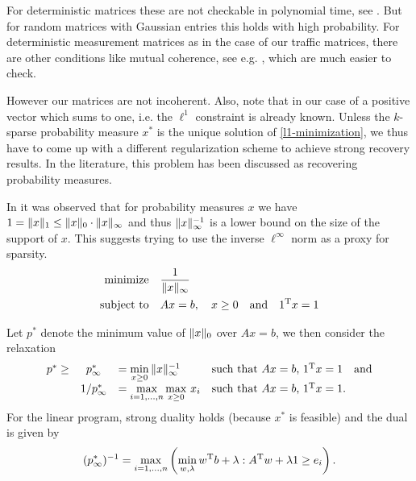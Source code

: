 \documentclass{article} %
\begin{document}
For deterministic matrices these are not checkable in polynomial time, see \cite{DonohoCheckable}. But for random matrices with Gaussian entries this holds with high probability. For deterministic measurement matrices as in the case of our traffic matrices, there are other conditions like mutual coherence, see e.g. \cite{Fuchs}, which are much easier to check.

\begin{theorem}[Incoherence]

\end{theorem}

However our matrices are not incoherent. Also, note that in our case of a positive vector which sums to one, i.e. the $\ell^1$ constraint is already known. Unless the $k$-sparse probability measure $x^*$ is the unique solution of \eqref{l1-minimization}, we thus have to come up with a different regularization scheme to achieve strong recovery results. In the literature, this problem has been discussed as recovering probability measures. 

In \cite{mert} it was observed that for probability measures $x$ we have $1 = \lVert x\rVert_1 \leq \lVert x\rVert_0\cdot \lVert x\rVert_\infty$ and thus $\lVert x\rVert_{\infty}^{-1}$ is a lower bound on the size of the support of $x$. This suggests trying to use the inverse $\ell^\infty$ norm as a proxy for sparsity.
\begin{equation}\label{l8-minimization}
  \begin{split}
    \text{minimize} &\quad \frac{1}{\lVert x\rVert_\infty}\\
    \text{subject to} &\quad Ax = b,\quad x\geq 0\quad\text{and}\quad 1^{\rm T} x = 1
  \end{split}
\end{equation}

Let $p^*$ denote the minimum value of $\lVert x\rVert_0$ over $Ax = b$, we then consider the relaxation
\begin{equation}\label{l8-recovery}
  \begin{array}{rcllllr}
  p^* \geq& p_\infty^* &= \min\limits_{x\geq 0}\, \lVert x\rVert_\infty^{-1}&\text{such that $Ax = b$, $1^{\rm T} x = 1$}\quad \text{and}\\[5pt]
  &1/p_\infty^* &= \max\limits_{i=1,\dots,n} \max\limits_{x\geq 0}\,x_i&\text{such that $Ax = b$, $1^{\rm T} x = 1$.}
  \end{array}
\end{equation}
For the linear program, strong duality holds (because $x^*$ is feasible) and the dual is given by
\begin{equation}\label{l8-recovery-dual}
  (p_\infty^*)^{-1} = \max_{i=1,\dots,n} \left(\min_{w,\lambda} w^{\rm T} b + \lambda : A^{\rm T} w + \lambda 1 \geq e_i\right).
\end{equation}
\end{document}
